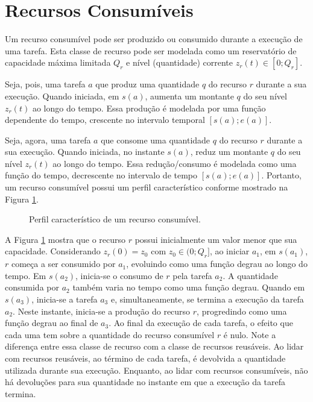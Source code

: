     \section{Recursos Consumíveis} \label{sec:recurso_consumivel}
    
        Um recurso consumível pode ser produzido ou consumido durante a execução de uma tarefa. Esta classe de recurso pode ser modelada como um reservatório de capacidade máxima limitada $Q_r$ e nível (quantidade) corrente $z_r(t) \in [0; Q_r]$.
        
        Seja, pois, uma tarefa $a$ que produz uma quantidade $q$ do recurso $r$ durante a sua execução. Quando iniciada, em $s(a)$, aumenta um montante $q$ do seu nível $z_r(t)$ ao longo do tempo. Essa produção é modelada por uma função dependente do tempo, crescente no intervalo temporal $[s(a); e(a)]$. 
        
        Seja, agora, uma tarefa $a$ que consome uma quantidade $q$ do recurso $r$ durante a sua execução. Quando iniciada, no instante $s(a)$, reduz um montante $q$ do seu nível $z_r(t)$ ao longo do tempo. Essa redução/consumo é modelada como uma função do tempo, decrescente no intervalo de tempo $[s(a); e(a)]$.  Portanto, um recurso consumível possui um perfil característico conforme mostrado na Figura \ref{fig:recurso_consumivel}.
        
        \begin{figure}[htb]
            \centering
            
            \caption{Perfil característico de um recurso consumível.} \label{fig:recurso_consumivel}
        \end{figure}
        
        A Figura \ref{fig:recurso_consumivel} mostra que o recurso $r$ possui inicialmente um valor menor que sua capacidade. Considerando $z_r(0) = z_0$ com $z_0 \in (0; Q_r]$, ao iniciar $a_1$, em $s(a_1)$, $r$ começa a ser consumido por $a_1$, evoluindo como uma função degrau ao longo do tempo. Em $s(a_2)$, inicia-se o consumo de $r$ pela tarefa $a_2$. A quantidade consumida por $a_2$ também varia no tempo como uma função degrau. Quando em $s(a_3)$, inicia-se a tarefa $a_3$ e, simultaneamente, se termina a execução da tarefa $a_2$. Neste instante, inicia-se a produção do recurso $r$, progredindo como uma função degrau ao final de $a_3$. Ao final da execução de cada tarefa, o efeito que cada uma tem sobre a quantidade do recurso consumível $r$ é nulo. Note a diferença entre essa classe de recurso com a classe de recursos reusáveis. Ao lidar com recursos reusáveis, ao término de cada tarefa, é devolvida a quantidade utilizada durante sua execução. Enquanto, ao lidar com recursos consumíveis, não há devoluções para sua quantidade no instante em que a execução da tarefa termina.
        
